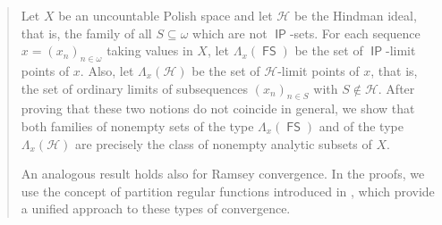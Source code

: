 \documentclass{amsart}
\theoremstyle{plain}
\theoremstyle{definition}
\theoremstyle{remark}
\DeclareMathOperator{\FS}{\mathsf{FS}}
\DeclareMathOperator{\IP}{\mathsf{IP}}
\begin{document}






\begin{abstract}
Let $X$ be an uncountable Polish space and let $\mathcal{H}$ be the Hindman ideal, that is, the family of all $S\subseteq \omega$ which are not $\IP$-sets. For each sequence $x=(x_n)_{n \in \omega}$ taking values in $X$, let $\Lambda_{x}(\FS)$ be the set of $\IP$-limit points of $x$. Also, let $\Lambda_{x}(\mathcal{H})$ be the set of $\mathcal{H}$-limit points of $x$, that is, the set of ordinary limits of subsequences $(x_n)_{n \in S}$ with $S\notin \mathcal{H}$. After proving that these two notions do not coincide in general, we show that both families of nonempty sets of the type $\Lambda_{x}(\FS)$ and of the type $\Lambda_{x}(\mathcal{H})$ are precisely the class of nonempty analytic subsets of $X$. 

An analogous result holds also for Ramsey convergence. In the proofs, we use the concept of partition regular functions introduced in 
\cite{FKK23}, 
which provide a unified approach to these types of convergence. 
\end{abstract}
\end{document}
